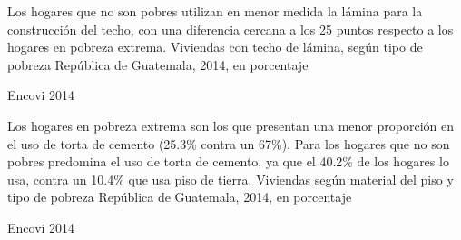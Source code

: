 
%
{%
Los hogares que no son pobres utilizan en menor medida la lámina para la construcción del techo, con una diferencia cercana a los 25 puntos respecto a los hogares en pobreza extrema. 
	}%
{%
	Viviendas con techo de lámina,  según tipo de pobreza} %
{%
	República de Guatemala, 2014, en porcentaje} %
{%
	\begin{tikzpicture}[x=1pt,y=1pt]    \end{tikzpicture}}%
{%
	Encovi 2014} %


%
{%
	Los hogares en   pobreza extrema son los que presentan una menor proporción en el uso de torta de cemento (25.3\% contra un 67\%). Para los hogares que no son pobres predomina el uso de torta de cemento, ya que el 40.2\% de los hogares lo usa, contra un 10.4\% que usa piso de tierra. 
}%
{%
	Viviendas según material del piso y tipo de pobreza} %
{%
	República de Guatemala, 2014, en porcentaje} %
{%
	\begin{tikzpicture}[x=1pt,y=1pt]    \end{tikzpicture}}%
{%
	Encovi 2014} %

